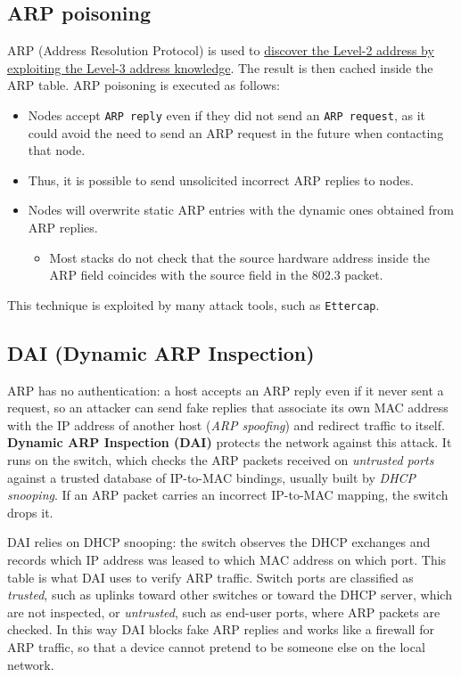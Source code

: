 \subsection{ARP poisoning}
ARP (Address Resolution Protocol) is used to \ul{discover the Level-2 address by exploiting the Level-3 address knowledge}. The result is then cached inside the ARP table. ARP poisoning is executed as follows:
\begin{itemize}
	\item Nodes accept \texttt{ARP reply} even if they did not send an \texttt{ARP request}, as it could avoid the need to send an ARP request in the future when contacting that node.
	\item Thus, it is possible to send unsolicited incorrect ARP replies to nodes.
	\item Nodes will overwrite static ARP entries with the dynamic ones obtained from ARP replies.
	      \begin{itemize}
		      \item Most stacks do not check that the source hardware address inside the ARP field coincides with the source field in the 802.3 packet.
	      \end{itemize}
\end{itemize}
This technique is exploited by many attack tools, such as \texttt{Ettercap}.

\subsection{DAI (Dynamic ARP Inspection)}
ARP has no authentication: a host accepts an ARP reply even if it never sent a request, so an attacker can send fake replies that associate its own MAC address with the IP address of another host (\textit{ARP spoofing}) and redirect traffic to itself. \textbf{Dynamic ARP Inspection (DAI)} protects the network against this attack. It runs on the switch, which checks the ARP packets received on \textit{untrusted ports} against a trusted database of IP-to-MAC bindings, usually built by \textit{DHCP snooping}. If an ARP packet carries an incorrect IP-to-MAC mapping, the switch drops it.

DAI relies on DHCP snooping: the switch observes the DHCP exchanges and records which IP address was leased to which MAC address on which port. This table is what DAI uses to verify ARP traffic. Switch ports are classified as \textit{trusted}, such as uplinks toward other switches or toward the DHCP server, which are not inspected, or \textit{untrusted}, such as end-user ports, where ARP packets are checked. In this way DAI blocks fake ARP replies and works like a firewall for ARP traffic, so that a device cannot pretend to be someone else on the local network.

